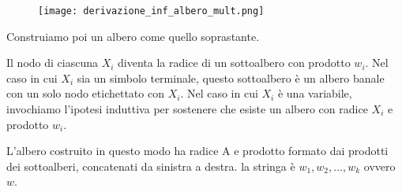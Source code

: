 \documentclass[11pt]{article}
\begin{document}
\begin{figure}[H]
\texttt{[image: derivazione\_inf\_albero\_mult.png]}
\centering
\end{figure}

Construiamo poi un albero come quello soprastante.

Il nodo di ciascuna $X_i$ diventa la radice di un sottoalbero con prodotto $w_i$. Nel caso in cui $X_i$ sia un simbolo terminale, questo sottoalbero è un albero banale con un solo nodo etichettato con $X_i$. Nel caso in cui $X_i$ è una variabile, invochiamo l'ipotesi induttiva per sostenere che esiste un albero con radice  $X_i$ e prodotto $w_i$. 

L'albero costruito in questo modo ha radice A e prodotto formato dai prodotti dei sottoalberi, concatenati da sinistra a destra. la stringa è $w_1, w_2, ... ,w_k$ ovvero $w$. 
\end{document}
